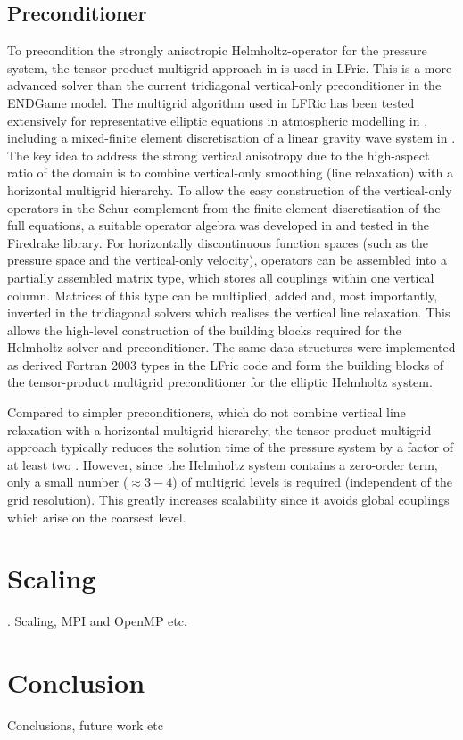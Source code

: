 \documentclass[times]{elsarticle}
\begin{document}
\subsection{\label{sec:preconditioner}Preconditioner}
To precondition the strongly anisotropic Helmholtz-operator for the pressure system, the tensor-product multigrid approach in \cite{Borm2001} is used in LFric. This is a more advanced solver than the current tridiagonal vertical-only preconditioner in the ENDGame model. The multigrid algorithm used in LFRic has been tested extensively for representative elliptic equations in atmospheric modelling in \cite{Mueller2014,Dedner2016}, including a mixed-finite element discretisation of a linear gravity wave system in \cite{Mitchell2016}. The key idea to address the strong vertical anisotropy due to the high-aspect ratio of the domain is to combine vertical-only smoothing (line relaxation) with a horizontal multigrid hierarchy. To allow the easy construction of the vertical-only operators in the Schur-complement from the finite element discretisation of the full equations, a suitable operator algebra was developed in \cite{Mitchell2016} and tested in the Firedrake library. For horizontally discontinuous function spaces (such as the pressure space and the vertical-only velocity), operators can be assembled into a partially assembled matrix type, which stores all couplings within one vertical column. Matrices of this type can be multiplied, added and, most importantly, inverted in the tridiagonal solvers which realises the vertical line relaxation. This allows the high-level construction of the building blocks required for the Helmholtz-solver and preconditioner. The same data structures were implemented as derived Fortran 2003 types in the LFric code and form the building blocks of the tensor-product multigrid preconditioner for the elliptic Helmholtz system.

Compared to simpler preconditioners, which do not combine vertical line relaxation with a horizontal multigrid hierarchy, the tensor-product multigrid approach typically reduces the solution time of the pressure system by a factor of at least two \cite{Mueller2014,Mitchell2016}. However, since the Helmholtz system contains a zero-order term, only a small number ($\approx 3-4$) of multigrid levels is required (independent of the grid resolution). This greatly increases scalability since it avoids global couplings which arise on the coarsest level.
\section{\label{sec:scal}Scaling}.
Scaling, MPI and OpenMP etc.

\section{Conclusion}
\label{sec:con}
Conclusions, future work etc



\end{document}
